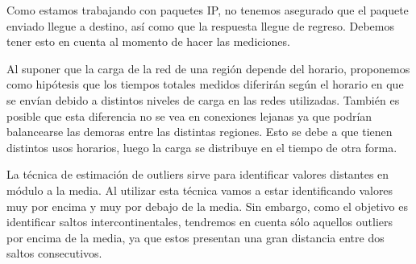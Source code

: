 Como estamos trabajando con paquetes IP, no tenemos asegurado que el paquete enviado llegue a destino, así como que la respuesta llegue de regreso. Debemos tener esto en cuenta al momento de hacer las mediciones.

Al suponer que la carga de la red de una región depende del horario, proponemos como hipótesis que los tiempos totales medidos diferirán según el horario en que se envían debido a distintos niveles de carga en las redes utilizadas. También es posible que esta diferencia no se vea en conexiones lejanas ya que podrían balancearse las demoras entre las distintas regiones. Esto se debe a que tienen distintos usos horarios, luego la carga se distribuye en el tiempo de otra forma.

La técnica de estimación de outliers sirve para identificar valores distantes en módulo a la media. Al utilizar esta técnica vamos a estar identificando valores muy por encima y muy por debajo de la media. Sin embargo, como el objetivo es identificar saltos intercontinentales, tendremos en cuenta sólo aquellos outliers por encima de la media, ya que estos presentan una gran distancia entre dos saltos consecutivos.
